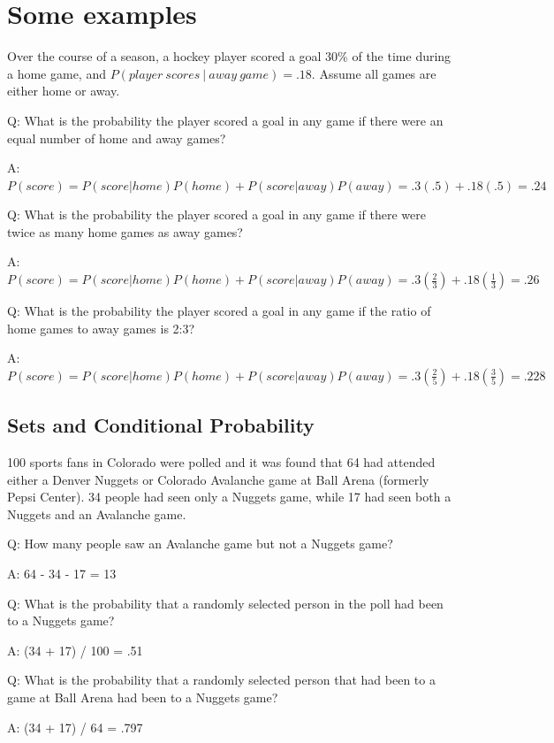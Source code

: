 \documentclass[
  11pt,
]{book}
\theoremstyle{definition}
\theoremstyle{definition}
\theoremstyle{definition}
\theoremstyle{definition}
\theoremstyle{remark}
\begin{document}
\hypertarget{some-examples}{%
\section{Some examples}\label{some-examples}}

Over the course of a season, a hockey player scored a goal 30\% of the time during a home game, and \(P(player\ scores\ |\ away\ game) = .18\). Assume all games are either home or away.

Q: What is the probability the player scored a goal in any game if there were an equal number of home and away games?

A: \(P(score) = P(score|home)P(home) + P(score|away)P(away) = .3(.5) + .18(.5) = .24\)

Q: What is the probability the player scored a goal in any game if there were twice as many home games as away games?

A: \(P(score) = P(score|home)P(home) + P(score|away)P(away) = .3(\frac{2}{3}) + .18(\frac{1}{3}) = .26\)

Q: What is the probability the player scored a goal in any game if the ratio of home games to away games is 2:3?

A: \(P(score) = P(score|home)P(home) + P(score|away)P(away) = .3(\frac{2}{5}) + .18(\frac{3}{5}) = .228\)

\hypertarget{sets-and-conditional-probability}{%
\subsection{Sets and Conditional Probability}\label{sets-and-conditional-probability}}

100 sports fans in Colorado were polled and it was found that 64 had attended either a Denver Nuggets or Colorado Avalanche game at Ball Arena (formerly Pepsi Center). 34 people had seen only a Nuggets game, while 17 had seen both a Nuggets and an Avalanche game.

Q: How many people saw an Avalanche game but not a Nuggets game?

A: 64 - 34 - 17 = 13

Q: What is the probability that a randomly selected person in the poll had been to a Nuggets game?

A: (34 + 17) / 100 = .51

Q: What is the probability that a randomly selected person that had been to a game at Ball Arena had been to a Nuggets game?

A: (34 + 17) / 64 = .797
\end{document}
